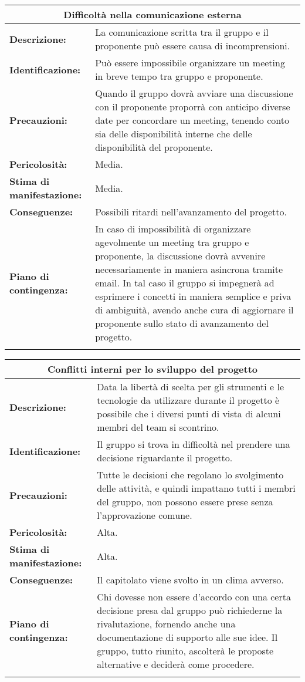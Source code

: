 \begin{tabularx}{\textwidth}{|X|X|}
\hline
\multicolumn{2}{|c|}{\textbf{Difficoltà nella comunicazione esterna}} \\
\hline
\textbf{Descrizione:}& La comunicazione scritta tra il gruppo e il proponente può essere causa di incomprensioni. \\
\hline
\textbf{Identificazione:}& Può essere impossibile organizzare un meeting in breve tempo tra gruppo e proponente. \\
\hline
\textbf{Precauzioni:}& Quando il gruppo dovrà avviare una discussione con il proponente proporrà con anticipo diverse date per concordare un meeting, tenendo conto sia delle disponibilità interne che delle disponibilità del proponente.\\
\hline
\textbf{Pericolosità:}& Media.\\
\hline
\textbf{Stima di manifestazione:}& Media.\\
\hline
\textbf{Conseguenze:}& Possibili ritardi nell'avanzamento del progetto.\\
\hline
\textbf{Piano di contingenza:}& In caso di impossibilità di organizzare agevolmente un meeting tra gruppo e proponente, la discussione dovrà avvenire necessariamente in maniera asincrona tramite email. In tal caso il gruppo si impegnerà ad esprimere i concetti in maniera semplice e priva di ambiguità, avendo anche cura di aggiornare il proponente sullo stato di avanzamento del progetto. \\
\hline
\caption{Difficoltà nella comunicazione esterna}
\end{tabularx}

\begin{tabularx}{\textwidth}{|X|X|}
\hline
\multicolumn{2}{|c|}{\textbf{Conflitti interni per lo sviluppo del progetto}} \\
\hline
\textbf{Descrizione:}& Data la libertà di scelta per gli strumenti e le tecnologie da utilizzare durante il progetto è possibile che i diversi punti di vista di alcuni membri del team si scontrino.\\
\hline
\textbf{Identificazione:}& Il gruppo si trova in difficoltà nel prendere una decisione riguardante il progetto.\\
\hline
\textbf{Precauzioni:}& Tutte le decisioni che regolano lo svolgimento delle attività, e quindi impattano tutti i membri del gruppo, non possono essere prese senza l'approvazione comune.\\
\hline
\textbf{Pericolosità:}& Alta.\\
\hline
\textbf{Stima di manifestazione:}& Alta.\\
\hline
\textbf{Conseguenze:}& Il capitolato viene svolto in un clima avverso.\\
\hline
\textbf{Piano di contingenza:}& Chi dovesse non essere d'accordo con una certa decisione presa dal gruppo può richiederne la rivalutazione, fornendo anche una documentazione di supporto alle sue idee. Il gruppo, tutto riunito, ascolterà le proposte alternative e deciderà come procedere.\\
\hline
\caption{Conflitti interni per lo sviluppo del progetto}
\end{tabularx}

